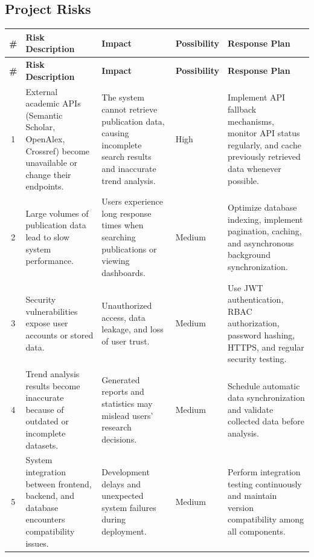 \documentclass[12pt,a4paper]{article}
\begin{document}
	\subsection{Project Risks}
\begin{longtable}{|c|p{3.5cm}|p{3.8cm}|p{1.8cm}|p{4.5cm}|}
	\hline
	\rowcolor{HeaderGray}
	\textbf{\#} &
	\textbf{Risk Description} &
	\textbf{Impact} &
	\textbf{Possibility} &
	\textbf{Response Plan}\\
	\hline
	\endfirsthead
	
	\hline
	\rowcolor{HeaderGray}
	\textbf{\#} &
	\textbf{Risk Description} &
	\textbf{Impact} &
	\textbf{Possibility} &
	\textbf{Response Plan}\\
	\hline
	\endhead
	
	1 &
	External academic APIs (Semantic Scholar, OpenAlex, Crossref) become unavailable or change their endpoints. &
	The system cannot retrieve publication data, causing incomplete search results and inaccurate trend analysis. &
	High &
	Implement API fallback mechanisms, monitor API status regularly, and cache previously retrieved data whenever possible.\\
	\hline
	
	2 &
	Large volumes of publication data lead to slow system performance. &
	Users experience long response times when searching publications or viewing dashboards. &
	Medium &
	Optimize database indexing, implement pagination, caching, and asynchronous background synchronization.\\
	\hline
	
	3 &
	Security vulnerabilities expose user accounts or stored data. &
	Unauthorized access, data leakage, and loss of user trust. &
	Medium &
	Use JWT authentication, RBAC authorization, password hashing, HTTPS, and regular security testing.\\
	\hline
	
	4 &
	Trend analysis results become inaccurate because of outdated or incomplete datasets. &
	Generated reports and statistics may mislead users' research decisions. &
	Medium &
	Schedule automatic data synchronization and validate collected data before analysis.\\
	\hline
	
	5 &
	System integration between frontend, backend, and database encounters compatibility issues. &
	Development delays and unexpected system failures during deployment. &
	Medium &
	Perform integration testing continuously and maintain version compatibility among all components.\\
	\hline
	

\end{longtable}
\end{document}
